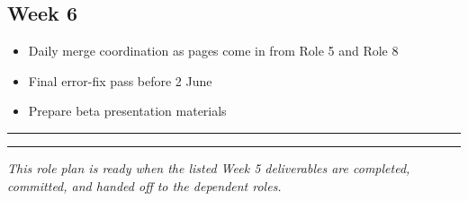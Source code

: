 \documentclass[11pt,a4paper]{article}
\newcommand{\grouprule}{\vspace{0.3em}\textcolor{ruleLine}{\rule{\linewidth}{0.4pt}}\vspace{0.3em}}
\begin{document}
\subsection{Week 6}

\begin{itemize}
\item Daily merge coordination as pages come in from Role 5 and Role 8
\item Final error-fix pass before 2 June
\item Prepare beta presentation materials
\end{itemize}

\grouprule
\vspace{1.2em}
\textcolor{uvtYellow}{\rule{\linewidth}{1.5pt}}

{\small\textit{This role plan is ready when the listed Week 5 deliverables are completed, committed, and handed off to the dependent roles.}}
\end{document}
